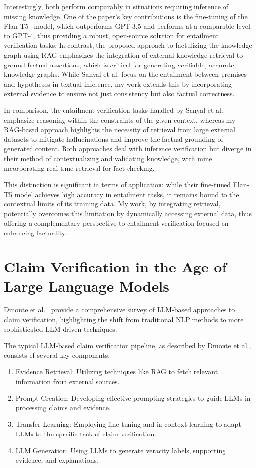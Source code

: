 Interestingly, both perform comparably in situations requiring inference of missing knowledge.
One of the paper's key contributions is the fine-tuning of the Flan-T5~\cite{https://doi.org/10.48550/arxiv.2210.11416} model, which outperforms GPT-3.5 and performs at a comparable level to GPT-4, thus providing a robust, open-source solution for entailment verification tasks.
In contrast, the proposed approach to factulizing the knowledge graph using \ac{RAG} emphasizes the integration of external knowledge retrieval to ground factual assertions, which is critical for generating verifiable, accurate knowledge graphs.
While Sanyal et al. focus on the entailment between premises and hypotheses in textual inference, my work extends this by incorporating external evidence to ensure not just consistency but also factual correctness.

In comparison, the entailment verification tasks handled by Sanyal et al. emphasize reasoning within the constraints of the given context, whereas my \ac{RAG}-based approach highlights the necessity of retrieval from large external datasets to mitigate hallucinations and improve the factual grounding of generated content.
Both approaches deal with inference verification but diverge in their method of contextualizing and validating knowledge, with mine incorporating real-time retrieval for fact-checking.

This distinction is significant in terms of application: while their fine-tuned Flan-T5 model achieves high accuracy in entailment tasks, it remains bound to the contextual limits of its training data.
My work, by integrating retrieval, potentially overcomes this limitation by dynamically accessing external data, thus offering a complementary perspective to entailment verification focused on enhancing factuality.

\section{Claim Verification in the Age of Large Language Models}\label{subsec:claim-verification-in-the-age-of-large-language-models}
Dmonte et al.~\cite{dmonte2024claimverificationagelarge} provide a comprehensive survey of \ac{LLM}-based approaches to claim verification, highlighting the shift from traditional \ac{NLP} methods to more sophisticated LLM-driven techniques.

The typical LLM-based claim verification pipeline, as described by Dmonte et al., consists of several key components:
\begin{enumerate}
    \item Evidence Retrieval: Utilizing techniques like \ac{RAG} to fetch relevant information from external sources.
    \item Prompt Creation: Developing effective prompting strategies to guide LLMs in processing claims and evidence.
    \item Transfer Learning: Employing fine-tuning and in-context learning to adapt LLMs to the specific task of claim verification.
    \item LLM Generation: Using LLMs to generate veracity labels, supporting evidence, and explanations.
\end{enumerate}

